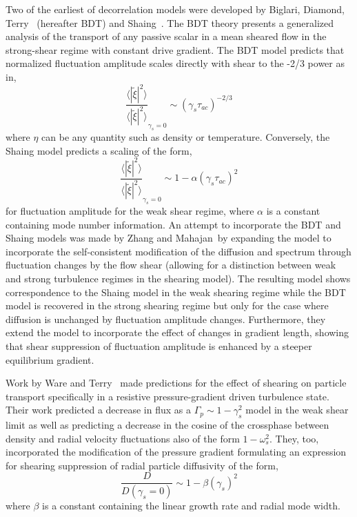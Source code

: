 \documentclass[aip,pop,amsmath,amssymb,reprint,superscriptaddress]{revtex4-1} %
\begin{document}
Two of the earliest of decorrelation models were developed by Biglari, Diamond, Terry~\cite{biglari90} (hereafter BDT) and Shaing~\cite{shaing90}. The BDT theory presents a generalized analysis of the transport of any passive scalar in a mean sheared flow in the strong-shear regime with constant drive gradient. The BDT model predicts that normalized fluctuation amplitude scales directly with shear to the -2/3 power as in,
%
\begin{equation}
\frac{\langle |\tilde{\xi}|^{2} \rangle}{\langle |\tilde{\xi}|^{2} \rangle}_{\gamma_{s}=0} \sim (\gamma_{s}\tau_{ac})^{-2/3}
\label{eq:BDT_theory}
\end{equation}
%
where $\eta$ can be any quantity such as density or temperature. Conversely, the Shaing model predicts a scaling of the form,
%
\begin{equation}
\frac{\langle |\tilde{\xi}|^{2} \rangle}{\langle |\tilde{\xi}|^{2} \rangle}_{\gamma_{s}=0} \sim 1- \alpha(\gamma_{s}\tau_{ac})^2
\label{eq:shaing_theory}
\end{equation}
%
for fluctuation amplitude for the weak shear regime, where $\alpha$ is a constant containing mode number information. An attempt to incorporate the BDT and Shaing models was made by Zhang and Mahajan~\cite{zhang92,zhang93}by expanding the model to incorporate the self-consistent modification of the diffusion and spectrum through fluctuation changes by the flow shear (allowing for a distinction between weak and strong turbulence regimes in the shearing model). The resulting model shows correspondence to the Shaing model in the weak shearing regime while the BDT model is recovered in the strong shearing regime but only for the case where diffusion is unchanged by fluctuation amplitude changes. Furthermore, they extend the model to incorporate the effect of changes in gradient length, showing that shear suppression of fluctuation amplitude is enhanced by a steeper equilibrium gradient. 

Work by Ware and Terry~\cite{ware96,ware98} made predictions for the effect of shearing on particle transport specifically in a resistive pressure-gradient driven turbulence state. Their work predicted a decrease in flux as a $\Gamma_{p} \sim 1-\gamma_{s}^2$ model in the weak shear limit as well as predicting a decrease in the cosine of the crossphase between density and radial velocity fluctuations also of the form $1-\omega_{s}^2$. They, too, incorporated the modification of the pressure gradient formulating an expression for shearing suppression of radial particle diffusivity of the form,
%
\begin{equation}
\frac{D}{D(\gamma_{s}=0)} \sim 1-\beta(\gamma_{s})^2
\label{eq:ware_diff_theory}
\end{equation}
%
where $\beta$ is a constant containing the linear growth rate and radial mode width.
\end{document}
